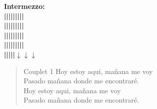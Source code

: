 \textbf{Intermezzo:}\\
\textbf{|\hspace{3em}|\hspace{3em}|\hspace{3em}|\hspace{3em}|\hspace{3em}|\hspace{3em}|\hspace{3em}|\hspace{3em}|}\\
\textbf{|\hspace{3.65em}|\hspace{3em}|\hspace{3em}|\hspace{3em}|\hspace{3em}|\hspace{3em}|\hspace{3em}|\hspace{3em}|}\\
\textbf{|\hspace{2.95em}|\hspace{3em}|\hspace{3em}|\hspace{2.2em}|\hspace{2.2em}|\hspace{3em}|\hspace{3em}|\hspace{2.3em}|}\\
\textbf{|\hspace{2.95em}|\hspace{3em}|\hspace{3em}|\hspace{2.2em}|\hspace{2.2em}|\hspace{3em}|\hspace{3em}|\hspace{2.9em}|}\\
\textbf{|\hspace{2em}|\hspace{2em}|\hspace{1.5em}|\hspace{1.5em}|$\downarrow\downarrow\downarrow$}

\begin{verse}{Couplet 1}
Hoy estoy aqui, ma\~{n}ana me voy\\
Pasado ma\~{n}ana donde me encontrar\'{e}.\\
Hoy estoy aqui, ma\~{n}ana me voy\\
Pasado ma\~{n}ana donde me encontrar\'{e}.\hspace{4em}\hspace{2em}\hspace{4em}\hspace{2em}\\
\end{verse}

